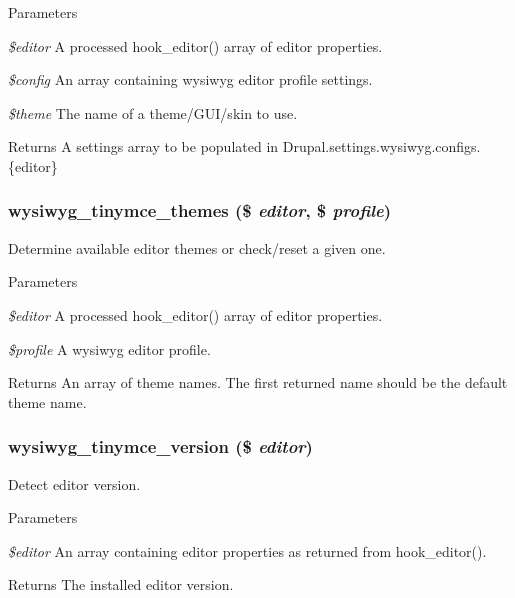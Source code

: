 \begin{DoxyParams}{Parameters}
\item[{\em \$editor}]A processed hook\_\-editor() array of editor properties. \item[{\em \$config}]An array containing wysiwyg editor profile settings. \item[{\em \$theme}]The name of a theme/GUI/skin to use.\end{DoxyParams}
\begin{DoxyReturn}{Returns}
A settings array to be populated in Drupal.settings.wysiwyg.configs.\{editor\} 
\end{DoxyReturn}
\hypertarget{tinymce_8inc_a3747f3017d77d34701e9c095a9298f52}{
\subsubsection[{wysiwyg\_\-tinymce\_\-themes}]{\setlength{\rightskip}{0pt plus 5cm}wysiwyg\_\-tinymce\_\-themes (\$ {\em editor}, \/  \$ {\em profile})}}
\label{tinymce_8inc_a3747f3017d77d34701e9c095a9298f52}
Determine available editor themes or check/reset a given one.


\begin{DoxyParams}{Parameters}
\item[{\em \$editor}]A processed hook\_\-editor() array of editor properties. \item[{\em \$profile}]A wysiwyg editor profile.\end{DoxyParams}
\begin{DoxyReturn}{Returns}
An array of theme names. The first returned name should be the default theme name. 
\end{DoxyReturn}
\hypertarget{tinymce_8inc_a2c23ae7b392dc9ea5ab00526b7b54a54}{
\subsubsection[{wysiwyg\_\-tinymce\_\-version}]{\setlength{\rightskip}{0pt plus 5cm}wysiwyg\_\-tinymce\_\-version (\$ {\em editor})}}
\label{tinymce_8inc_a2c23ae7b392dc9ea5ab00526b7b54a54}
Detect editor version.


\begin{DoxyParams}{Parameters}
\item[{\em \$editor}]An array containing editor properties as returned from hook\_\-editor().\end{DoxyParams}
\begin{DoxyReturn}{Returns}
The installed editor version. 
\end{DoxyReturn}
